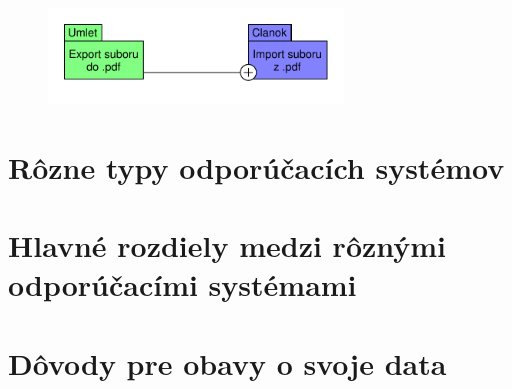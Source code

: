 \documentclass[10pt,twocolumn,twoside,slovak,a4paper]{article}
\begin{document}
\begin{figure}
\centering
\includegraphics[height =1in,width=\textwidth]{diagram_3.pdf}
\end{figure}


\section{Rôzne typy odporúčacích systémov}

\section{Hlavné rozdiely medzi rôznými odporúčacími systémami}

\section{Dôvody pre obavy o svoje data}


\end{document}
